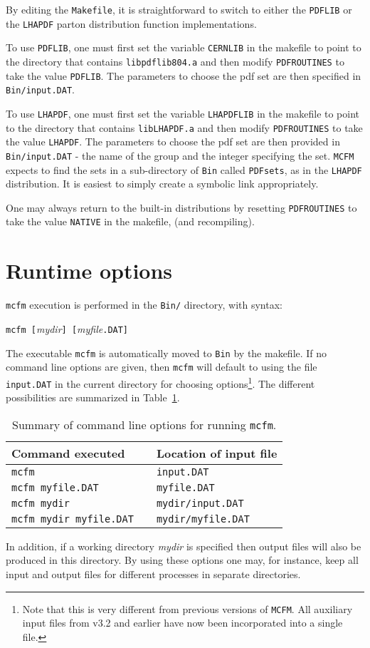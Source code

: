\documentclass[12pt]{article}
\begin{document}
By editing the {\tt Makefile}, it is straightforward to switch to
either the {\tt PDFLIB} or the {\tt LHAPDF} parton distribution
function implementations.

To use {\tt PDFLIB}, one must first set the variable {\tt CERNLIB}
in the makefile to point to the directory that contains
{\tt libpdflib804.a} and then modify {\tt PDFROUTINES} to
take the value {\tt PDFLIB}. The parameters to choose the
pdf set are then specified in {\tt Bin/input.DAT}.

To use {\tt LHAPDF}, one must first set the variable {\tt LHAPDFLIB}
in the makefile to point to the directory that contains
{\tt libLHAPDF.a} and then modify {\tt PDFROUTINES} to
take the value {\tt LHAPDF}. The parameters to choose the
pdf set are then provided in {\tt Bin/input.DAT} - 
the name of the group and the integer specifying 
the set.
{\tt MCFM} expects to find the sets in a sub-directory of {\tt Bin} called
{\tt PDFsets}, as in the {\tt LHAPDF} distribution. It is easiest to
simply create a symbolic link appropriately.

One may always return to the built-in distributions by resetting
{\tt PDFROUTINES} to take the value {\tt NATIVE}  in the makefile,
(and recompiling).
\clearpage
\section{Runtime options}

{\tt mcfm} execution is performed in the {\tt Bin/} directory,
with syntax:
\begin{center}
{\tt mcfm [}{\it mydir}{\tt ] [}{\it myfile}{\tt .DAT]}
\end{center}
The executable {\tt mcfm} is automatically moved to {\tt Bin} by the makefile.
If no command line options are given, then {\tt mcfm} will default
to using the file {\tt input.DAT} in the current directory for
choosing options\footnote{Note that this is very different from
previous versions of {\tt MCFM}. All auxiliary input files from v3.2 and
earlier have now been incorporated into a single file.}.
The different possibilities are summarized in Table~\ref{clopts}.
\begin{table}
\begin{center}
\begin{tabular}{l|cl}
Command executed && Location of input file \\
\hline
{\tt mcfm}                      && {\tt input.DAT} \\
{\tt mcfm myfile.DAT}           && {\tt myfile.DAT} \\
{\tt mcfm mydir}                && {\tt mydir/input.DAT} \\
{\tt mcfm mydir myfile.DAT}     && {\tt mydir/myfile.DAT} \\
\end{tabular}
\end{center}
\caption{Summary of command line options for running {\tt mcfm}.}
\label{clopts}
\end{table}
In addition, if a working directory {\it mydir} is specified then
output files will also be produced in this directory. By using these
options one may, for instance, keep all input and output files for
different processes in separate directories.
\end{document}
